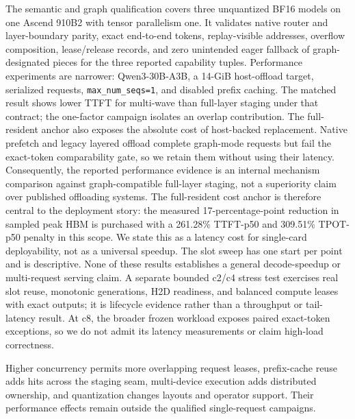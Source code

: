 The semantic and graph qualification covers three unquantized BF16 models on
one Ascend 910B2 with tensor parallelism one. It validates native router and
layer-boundary parity, exact end-to-end tokens, replay-visible addresses,
overflow composition, lease/release records, and zero unintended eager
fallback of graph-designated pieces for the three reported capability tuples.
Performance experiments are narrower:
Qwen3-30B-A3B, a 14-GiB host-offload target, serialized requests,
\texttt{max\_num\_seqs=1}, and disabled prefix caching. The matched result
shows lower TTFT for multi-wave than full-layer staging under that contract;
the one-factor campaign isolates an overlap contribution. The full-resident
anchor also exposes the absolute cost of host-backed replacement. Native
prefetch and legacy layered offload complete graph-mode requests but fail the
exact-token comparability gate, so we retain them without using their latency.
Consequently, the reported performance evidence is an internal mechanism
comparison against graph-compatible full-layer staging, not a superiority claim
over published offloading systems.
The full-resident cost anchor is therefore central to the deployment story:
the measured 17-percentage-point reduction in sampled peak HBM is purchased
with a 261.28\% TTFT-p50 and 309.51\% TPOT-p50 penalty in this scope. We state
this as a latency cost for single-card deployability, not as a universal
speedup.
The slot sweep has one start per point and is descriptive. None of these
results establishes a general decode-speedup or multi-request serving claim.
A separate bounded c2/c4 stress test exercises real slot reuse, monotonic
generations, H2D readiness, and balanced compute leases with exact outputs; it
is lifecycle evidence rather than a throughput or tail-latency result.
At c8, the broader frozen workload exposes paired exact-token exceptions, so
we do not admit its latency measurements or claim high-load correctness.

Higher concurrency permits more overlapping request leases, prefix-cache reuse
adds hits across the staging seam, multi-device execution adds distributed
ownership, and quantization changes layouts and operator support. Their
performance effects remain outside the qualified single-request campaigns.
